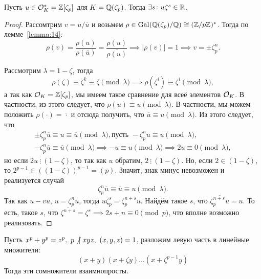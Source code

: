  	\begin{lemma} 
 		Пусть $u \in \mathcal{O}_{K}^{*} = \mathbb{Z}[\zeta_{p}]$ для $K = \mathbb{Q}(\zeta_{p})$. Тогда $\exists s \colon u \zeta^{s} \in \mathbb{R}$.

 		\begin{proof}
 			Рассомтрим $v = u / \overline{u}$ и возьмем $\rho \in \Gal\lr*{\Q(\zeta_{p})/\Q} \cong (\Z/p\Z)^{*}$. Тогда по лемме~\ref{lemma:14}:
 			\[
 				\rho(v) = \frac{\rho(u)}{\rho(\overline{u})}  = \frac{\rho(u)}{\overline{\rho(u)}}	 \implies |\rho(v)| = 1 \implies v = \pm \zeta_{p}^{n}.
		 	\] 	

		 	Рассмотрим $\lambda = 1 - \zeta$, тогда 
		 	\[
		 		\rho(\zeta) \equiv \zeta^k \equiv \zeta \pmod{\lambda} \implies \rho(\zeta^i) \equiv \zeta^i \pmod{\lambda},
		 	\]
		 	а так как $\mathcal{O}_{K} = \mathbb{Z}[\zeta_{p}]$, мы имеем такое сравнение для всеё элементов $\mathcal{O}_{K}$. В частности, из этого следует, что $\rho(u) \equiv u \pmod{\lambda}$. В частности, мы можем положить $\rho(\cdot) = \overline{\cdot}$ и отсюда получить, что $\overline{u} \equiv u \pmod{\lambda}$. Из этого следует, что 
		 	\begin{multline*}
		 		\pm \zeta^{n}_{p} \overline{u} \equiv u \equiv \overline{u} \pmod{\lambda}, \text{пусть } -\zeta^{n}_{p}u \equiv u \pmod{\lambda}, \\ -\zeta^{n}_{p}\overline{u} \equiv \overline{u} \pmod{\lambda} \implies -u \equiv u \pmod{\lambda} \implies 2u \equiv 0 \pmod{\lambda},
		 	\end{multline*}
		 	но если $2u \ \vdots \  (1 - \zeta)$, то так как $u$ обратим, $2 \ \vdots \ (1 - \zeta)$.  Но, если $2 \in (1 - \zeta)$, то $2^{p - 1} \in ((1 - \zeta))^{p - 1} = (p)$. Значит, знак минус невозможен и реализуется случай 
		 	\[
		 		\zeta^n_{p} \overline{u} \equiv \overline{u} \equiv u \pmod{\lambda}. 
		 	\]
		 	Так как $u - v \overline{u}$, $u = \zeta^{n}_{p} \overline{u}$, тогда $u \zeta_{p}^{s} = \zeta_{p}^{n + s}\overline{u}$. Найдём такое $s$, что $\overline{\zeta_{p}^{n + s} \overline{u}} = u$. То есть, такое $s$, что $\overline{\zeta^{n + s}} = \zeta^{s} \implies 2s + n \equiv 0 \pmod{p}$, что вполне возможно реализовать. 
 		\end{proof}
 	\end{lemma}

 	\begin{lemma}\label{lemma:15}
 		Пусть $x^p + y^p = z^p, \ p \not \ \mid xyz, \ (x, y, z) = 1$, разложим левую часть в линейные множители:
 	\[
 		(x + y)(x + \zeta y)\ldots(x + \zeta^{p - 1}y)
 	\]
 	Тогда  эти сомножители взаимнопросты. 	
 	\end{lemma}
 	

